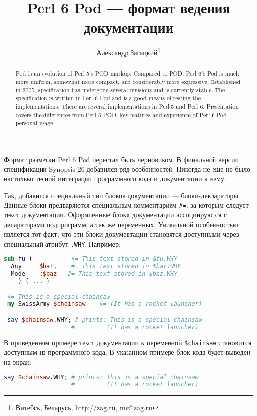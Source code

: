 \documentclass[10pt, a5paper]{article}
\begin{document}
\title{Perl 6 Pod --- формат ведения документации}
\author{Александр Загацкий\footnote{Витебск, Беларусь, \url{http://zag.ru}, \url{me@zag.ru}}}
\date{}
\maketitle

\begin{abstract}
Pod is an evolution of Perl 5's POD markup. Compared to POD, Perl 6's
Pod is much more
uniform, somewhat more compact, and considerably more
expressive. Established in 2005, specification
has undergone several revisions and is currently stable. The
specification is written in Perl 6 Pod and is a
good means of testing the implementations.
There are several implementations in Perl 5 and Perl 6.
Presentation covers the differences from Perl 5 POD, key features and 
experience of Perl 6 Pod personal usage.
\end{abstract}

Формат разметки Perl 6 Pod перестал быть черновиком. В финальной версии
спецификации Synopsis 26 \cite{zag1pod} добавился ряд особенностей.
Никогда не еще не было настолько тесной интеграции программного кода и
документации к нему.

Так, добавился специальный тип блоков документации --- блоки-деклараторы.
Данные блоки предваряются специальным комментарием \verb!#=!, за которым
следует текст документации. Оформленные блоки документации ассоциируются
с делараторами подпрограмм, а так же переменных. Уникальной особенностью
является тот факт, что эти блоки документации становятся доступными
через специальный атрибут \verb!.WHY!. Например:

\begin{lstlisting}[language={Perl}]
 sub fu (           #= This text stored in &fu.WHY
  Any     $bar,    #= This text stored in $bar.WHY
  Mode    :$baz   #= This text stored in $baz.WHY
    ) { ... }

 #= This is a special chainsaw
 my SwissArmy $chainsaw    #= (It has a rocket launcher)

 say $chainsaw.WHY; # prints: This is a special chainsaw
                   #         (It has a rocket launcher)
\end{lstlisting}


В приведенном примере текст документации к переменной \verb!$chainsaw!
становится доступным из программного кода. В указанном примере блок кода
будет выведен на экран:
\begin{lstlisting}[language={Perl}]
 say $chainsaw.WHY; # prints: This is a special chainsaw
                   #         (It has a rocket launcher)
\end{lstlisting}
\end{document}
